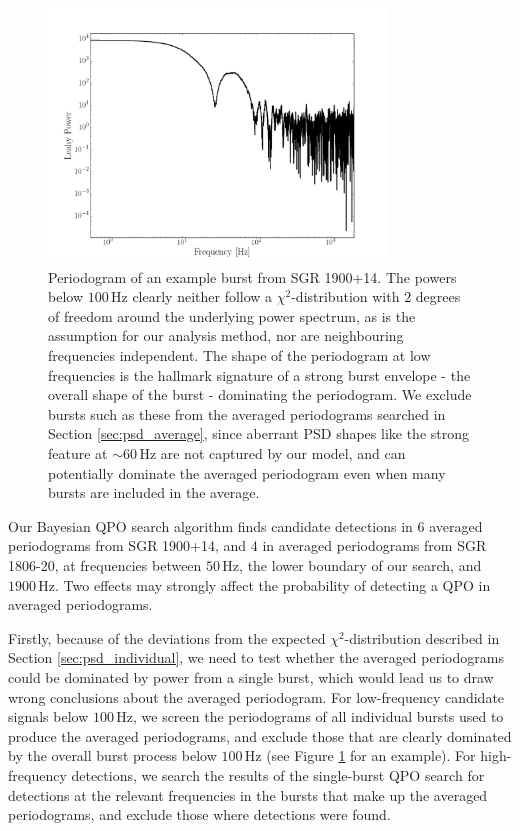 \documentclass[numberedappendix]{emulateapj}
\newcommand{\hz}{\,\mathrm{Hz}}
\begin{document}
\begin{figure}[htbp]
\begin{center}
\includegraphics[width=9cm]{envelope_burst_ps.png}
\caption{Periodogram of an example burst from SGR 1900+14. The powers below $100 \hz$ clearly neither follow a $\chi^2$-distribution with $2$ degrees of freedom around the underlying power spectrum, as is the assumption for our analysis method, nor are neighbouring frequencies independent. The shape of the periodogram at low frequencies is the hallmark signature of a strong burst envelope - the overall shape of the burst - dominating the periodogram. We exclude bursts such as these from the averaged periodograms searched in Section \ref{sec:psd_average}, since aberrant PSD shapes like the strong feature at $\sim 60 \hz$ are not captured by our model, and can potentially dominate the averaged periodogram even when many bursts are included in the average.}
\label{fig:envelope_example}
\end{center}
\end{figure}


Our Bayesian QPO search algorithm finds candidate detections in $6$ averaged periodograms from SGR 1900+14, and $4$ in averaged periodograms from SGR 1806-20, at frequencies between $50 \hz$, the lower boundary of our search, and $1900 \hz$. 
Two effects may strongly affect the probability of detecting a QPO in averaged periodograms.

Firstly, because of the deviations from the expected $\chi^2$-distribution described in Section \ref{sec:psd_individual}, we need to test whether the averaged periodograms could be dominated by power from a single burst, which would lead us to draw wrong conclusions about the averaged periodogram. For low-frequency candidate signals below $100 \hz$, we screen the periodograms of all individual bursts used to produce the averaged periodograms, and exclude those that are clearly dominated by the overall burst process below $100 \hz$ (see Figure \ref{fig:envelope_example} for an example). For high-frequency detections, we search the results of the single-burst QPO search for detections at the relevant frequencies in the bursts that make up the averaged periodograms, and exclude those where detections were found. 
\end{document}
